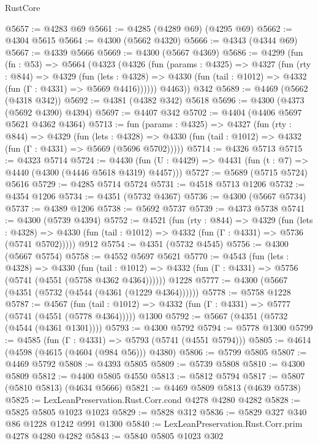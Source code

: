 \begin{lexlean}{RustCore}
\begin{coremodule}
@5657 := @4283 @69
@5661 := @4285 (@4289 @69) (@4295 @69)
@5662 := @4304 @5615
@5664 := @4300 (@5662 @4320)
@5666 := @4343 (@4344 @69)
@5667 := @4339 @5666
@5669 := @4300 (@5667 @4369)
@5686 := @4299
    (fun (fn : @53) =>
    @5664
      (@4323
        (@4326
          (fun (params : @4325) =>
          @4327
            (fun (rty : @844) =>
            @4329
              (fun (lets : @4328) =>
              @4330 (fun (tail : @1012) => @4332 (fun (Γ : @4331) => @5669 @4416))))))
        @4463))
    @342
@5689 := @4469 (@5662 (@4318 @342))
@5692 := @4381 (@4382 @342) @5618
@5696 := @4300 (@4373 (@5692 @4390) @4394)
@5697 := @4407 @342
@5702 := @4404 (@4406 @5697 @5621 @4362 @4364)
@5713 := fun (params : @4325) =>
  @4327
    (fun (rty : @844) =>
    @4329
      (fun (lets : @4328) =>
      @4330 (fun (tail : @1012) => @4332 (fun (Γ : @4331) => @5669 (@5696 @5702)))))
@5714 := @4326 @5713
@5715 := @4323 @5714
@5724 := @4430 (fun (U : @4429) => @4431 (fun (t : @7) => @4440 (@4300 (@4446 @5618 @4319) @4457)))
@5727 := @5689 (@5715 @5724) @5616
@5729 := @4285 @5714 @5724
@5731 := @4518 @5713 @1206
@5732 := @4354 @1206
@5734 := @4351 (@5732 @4367)
@5736 := @4300 (@5667 @5734)
@5737 := @4389 @1206
@5738 := @5692 @5737
@5739 := @4373 @5738
@5741 := @4300 (@5739 @4394)
@5752 := @4521
    (fun (rty : @844) =>
    @4329
      (fun (lets : @4328) =>
      @4330 (fun (tail : @1012) => @4332 (fun (Γ : @4331) => @5736 (@5741 @5702)))))
    @912
@5754 := @4351 (@5732 @4545)
@5756 := @4300 (@5667 @5754)
@5758 := @4552 @5697 @5621
@5770 := @4543
    (fun (lets : @4328) =>
    @4330
      (fun (tail : @1012) => @4332 (fun (Γ : @4331) => @5756 (@5741 (@4551 (@5758 @4362 @4364))))))
    @1228
@5777 := @4300 (@5667 (@4351 (@5732 (@4544 (@4361 (@1229 @4364))))))
@5778 := @5758 @1228
@5787 := @4567
    (fun (tail : @1012) => @4332 (fun (Γ : @4331) => @5777 (@5741 (@4551 (@5778 @4364)))))
    @1300
@5792 := @5667 (@4351 (@5732 (@4544 (@4361 @1301))))
@5793 := @4300 @5792
@5794 := @5778 @1300
@5799 := @4585 (fun (Γ : @4331) => @5793 (@5741 (@4551 @5794)))
@5805 := @4614 (@4598 (@4615 (@4604 (@984 @56))) @4380)
@5806 := @5799 @5805
@5807 := @4469 @5792
@5808 := @4393 @5805
@5809 := @5739 @5808
@5810 := @4300 @5809
@5812 := @4400 @5805 @4550
@5813 := @5812 @5794
@5817 := @5807 (@5810 @5813) (@4634 @5666)
@5821 := @4469 @5809 @5813 (@4639 @5738)
@5825 := LexLeanPreservation.Rust.Corr.cond @4278 @4280 @4282
@5828 := @5825 @5805 @1023 @1023
@5829 := @5828 @312
@5836 := @5829 @327 @340 @86 @1228 @1242 @991 @1300
@5840 := LexLeanPreservation.Rust.Corr.prim @4278 @4280 @4282
@5843 := @5840 @5805 @1023 @302

\end{coremodule}
\end{lexlean}
